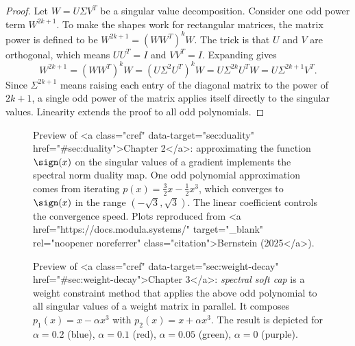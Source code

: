\begin{proof}
    Let $W = U \Sigma V^T$ be a singular value decomposition. Consider one odd power term $W^{2k + 1}$. To make the shapes work for rectangular matrices, the matrix power is defined to be $W^{2k + 1} = (WW^T)^k W$. The trick is that $U$ and $V$ are orthogonal, which means $UU^T = I$ and $VV^T = I$. Expanding gives \begin{equation}
        W^{2k+1} =  (WW^T)^k W = (U \Sigma^2 U^T)^k W = U \Sigma^{2k} U^T W = U \Sigma^{2k+1} V^T.
    \end{equation} Since $\Sigma^{2k+1}$ means raising each entry of the diagonal matrix to the power of $2k+1$, a single odd power of the matrix applies itself directly to the singular values. Linearity extends the proof to all odd polynomials.
\end{proof}

\begin{figure}[t]
    \centering
    \subfloat{
        
    }
    \hspace{0.03\textwidth}
    \subfloat{
        
    }
    \caption{Preview of <a class="cref" data-target="sec:duality" href="#sec:duality">Chapter 2</a>: approximating the function $\sign(x)$ on the singular values of a gradient implements the spectral norm duality map. One odd polynomial approximation comes from iterating $p(x) = \tfrac32 x - \tfrac12 x^3$, which converges to $\sign(x)$ in the range $(-\sqrt{3}, \sqrt{3})$. The linear coefficient controls the convergence speed. Plots reproduced from <a href="https://docs.modula.systems/" target="_blank" rel="noopener noreferrer" class="citation">Bernstein (2025</a>).}  %
    \label{fig:newton-schulz-simple}
\end{figure}


\begin{figure}[t]
    \centering
    
    \caption{Preview of <a class="cref" data-target="sec:weight-decay" href="#sec:weight-decay">Chapter 3</a>: \textit{spectral soft cap} is a weight constraint method that applies the above odd polynomial to all singular values of a weight matrix in parallel. It composes $p_1(x) = x - \alpha x^3$ with $p_2(x) = x + \alpha x^3$. The result is depicted for $\alpha = 0.2$ (blue), $\alpha = 0.1$ (red), $\alpha = 0.05$ (green), $\alpha = 0$ (purple).}
    \label{fig:odd-poly-family}
\end{figure}



